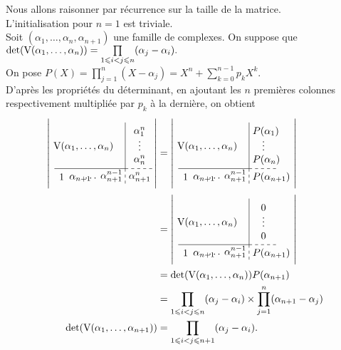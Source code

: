 \newcommand{\detvandzero}{
\left|\begin{gathered}
    \tikzpicture[every node/.style={anchor=south west}]
        \node[minimum width=2cm,minimum height=1.5cm] at (-0.16,0.625) {$\Vandermonde(\alpha_1, \dots, \alpha_n)$};
        \node[minimum width=0.5cm,minimum height=0.5cm] at (0,0.05) {$1$};
        \node[minimum width=0.5cm,minimum height=0.5cm] at (0.4, 0) {$\alpha_{n+1}$};
        \node[minimum width=0.5cm,minimum height=0.5cm] at (0.95,0) {$\cdots$};
        \node[minimum width=0.5cm,minimum height=0.5cm] at (1.5,0) {$\alpha_{n+1}^{n-1}$};
        \node[minimum width=1cm,minimum height=0.5cm] at (2.5,0) {$P(\alpha_{n+1})$};
        \node[minimum width=1cm,minimum height=1cm] at (2.5,0.4) {$0$};
        \node[minimum width=1cm,minimum height=1cm] at (2.5,1) {$\vdots$};
        \node[minimum width=1cm,minimum height=1cm] at (2.5,1.4) {$0$};
        \draw (0,0.6) -- (2.5,0.6);
        \draw (2.5,0.6) -- (2.5,2.225);
        \draw[dashed] (2.5,0.6) -- (3.5,0.6);
        \draw[dashed] (2.5,0.6) -- (2.5,0);
    \endtikzpicture
    \end{gathered}\right|
}

\begin{preuve}
    Nous allons raisonner par récurrence sur la taille de la matrice. \\
    L'initialisation pour $n = 1$ est triviale. \\
    Soit $(\alpha_1, \dots, \alpha_n, \alpha_{n+1})$ une famille de complexes. On suppose que $\det(\mathrm{V}(\alpha_1, \dots, \alpha_n)) = \prod\limits_{1\leqslant i < j \leqslant n}(\alpha_j - \alpha_i).$ \\
    On pose $P(X)=\prod\limits_{j=1}^n (X-\alpha_j) = X^n + \sum\limits_{k=0}^{n-1} p_k X^k$. \\
    D'après les propriétés du déterminant, en ajoutant les $n$ premières colonnes respectivement multipliée par $p_k$ à la dernière, on obtient
    \begin{align*}
        \detvandnplusun &= \detvandpoly \\
        &= \detvandzero \\
        &= \det(\Vandermonde(\alpha_1, \dots, \alpha_n)) P(\alpha_{n+1}) \\
        &= \prod\limits_{1\leqslant i < j \leqslant n}(\alpha_j - \alpha_i) \times \prod\limits_{j=1}^n (\alpha_{n+1}-\alpha_j) \\
        \det(\Vandermonde(\alpha_1, \dots, \alpha_{n+1})) &= \prod_{1\leqslant i < j \leqslant n + 1}(\alpha_j - \alpha_i).
    \end{align*}
\end{preuve}

